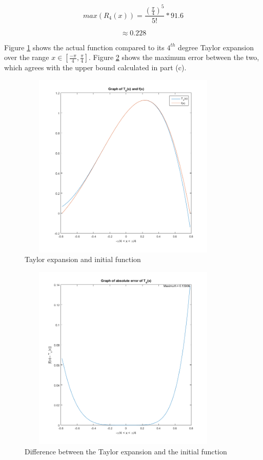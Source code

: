 	$$max(R_4(x)) = \frac{(\frac{\pi}{4})^5}{5!}*91.6$$

	$$\approx 0.228$$

\newpage

\item

Figure \ref{fig:graph1} shows the actual function compared to its $4^{th}$ degree Taylor expansion over the range
$x \in [\frac{-\pi}{4} , \frac{\pi}{4} ]$. Figure \ref{fig:graph2} shows the maximum error between the two, which
agrees with the upper bound calculated in part (c).

\begin{figure}[h!]
	\centering
	\includegraphics[width=4in, height=3.5in]{tf.png}
	\caption{Taylor expansion and initial function}
	\label{fig:graph1}
\end{figure}

\begin{figure}[!h]
	\centering
	\includegraphics[width=4in, height=3.5in]{abs_error.PNG}
	\caption{Difference between the Taylor expansion and the initial function}
	\label{fig:graph2}
\end{figure}

